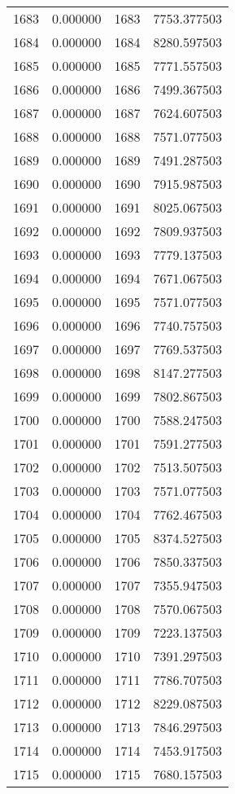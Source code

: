 \documentclass[12pt]{article}
\begin{document}
\begin{longtable}{@{}cccc@{}}
1683 & 0.000000 & 1683 & 7753.377503 \\
1684 & 0.000000 & 1684 & 8280.597503 \\
1685 & 0.000000 & 1685 & 7771.557503 \\
1686 & 0.000000 & 1686 & 7499.367503 \\
1687 & 0.000000 & 1687 & 7624.607503 \\
1688 & 0.000000 & 1688 & 7571.077503 \\
1689 & 0.000000 & 1689 & 7491.287503 \\
1690 & 0.000000 & 1690 & 7915.987503 \\
1691 & 0.000000 & 1691 & 8025.067503 \\
1692 & 0.000000 & 1692 & 7809.937503 \\
1693 & 0.000000 & 1693 & 7779.137503 \\
1694 & 0.000000 & 1694 & 7671.067503 \\
1695 & 0.000000 & 1695 & 7571.077503 \\
1696 & 0.000000 & 1696 & 7740.757503 \\
1697 & 0.000000 & 1697 & 7769.537503 \\
1698 & 0.000000 & 1698 & 8147.277503 \\
1699 & 0.000000 & 1699 & 7802.867503 \\
1700 & 0.000000 & 1700 & 7588.247503 \\
1701 & 0.000000 & 1701 & 7591.277503 \\
1702 & 0.000000 & 1702 & 7513.507503 \\
1703 & 0.000000 & 1703 & 7571.077503 \\
1704 & 0.000000 & 1704 & 7762.467503 \\
1705 & 0.000000 & 1705 & 8374.527503 \\
1706 & 0.000000 & 1706 & 7850.337503 \\
1707 & 0.000000 & 1707 & 7355.947503 \\
1708 & 0.000000 & 1708 & 7570.067503 \\
1709 & 0.000000 & 1709 & 7223.137503 \\
1710 & 0.000000 & 1710 & 7391.297503 \\
1711 & 0.000000 & 1711 & 7786.707503 \\
1712 & 0.000000 & 1712 & 8229.087503 \\
1713 & 0.000000 & 1713 & 7846.297503 \\
1714 & 0.000000 & 1714 & 7453.917503 \\
1715 & 0.000000 & 1715 & 7680.157503 \\

\end{longtable}
\end{document}
